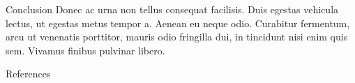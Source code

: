 \documentclass[final]{beamer}
\begin{document}
\begin{frame}[t]
\begin{columns}[t]
\begin{column}{.30\textwidth}

\begin{block}{Conclusion}
  Donec ac urna non tellus consequat facilisis. Duis egestas vehicula lectus, ut egestas metus tempor a. Aenean eu neque odio. Curabitur fermentum, arcu ut venenatis porttitor, mauris odio fringilla dui, in tincidunt nisi enim quis sem. Vivamus finibus pulvinar libero.
\end{block}

\begin{block}{References}

    {
    \printbibliography
    }
     
\end{block}

\end{column}

\end{columns}

\end{frame}
\end{document}
